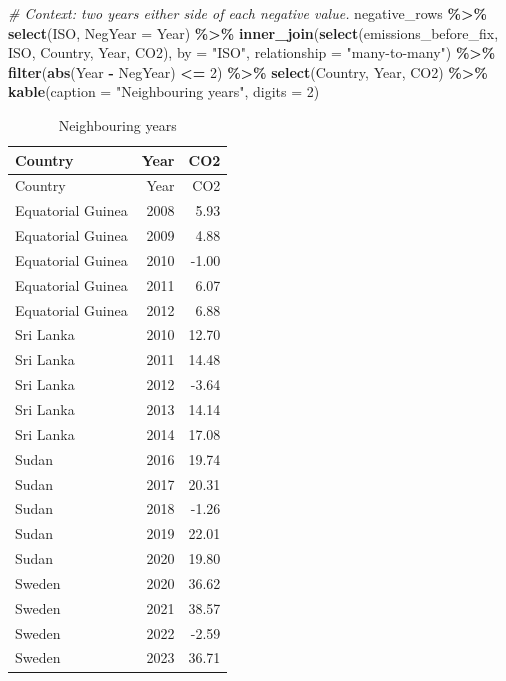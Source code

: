 \documentclass[
]{article}
\newenvironment{Shaded}{\begin{snugshade}}{\end{snugshade}}
\newcommand{\AttributeTok}[1]{\textcolor[rgb]{0.13,0.29,0.53}{#1}}
\newcommand{\CommentTok}[1]{\textcolor[rgb]{0.56,0.35,0.01}{\textit{#1}}}
\newcommand{\DecValTok}[1]{\textcolor[rgb]{0.00,0.00,0.81}{#1}}
\newcommand{\FunctionTok}[1]{\textcolor[rgb]{0.13,0.29,0.53}{\textbf{#1}}}
\newcommand{\NormalTok}[1]{#1}
\newcommand{\SpecialCharTok}[1]{\textcolor[rgb]{0.81,0.36,0.00}{\textbf{#1}}}
\newcommand{\StringTok}[1]{\textcolor[rgb]{0.31,0.60,0.02}{#1}}
\begin{document}
\begin{Shaded}
\begin{Highlighting}[]
\CommentTok{\# Context: two years either side of each negative value.}
\NormalTok{negative\_rows }\SpecialCharTok{\%\textgreater{}\%}
  \FunctionTok{select}\NormalTok{(ISO, }\AttributeTok{NegYear =}\NormalTok{ Year) }\SpecialCharTok{\%\textgreater{}\%}
  \FunctionTok{inner\_join}\NormalTok{(}\FunctionTok{select}\NormalTok{(emissions\_before\_fix, ISO, Country, Year, CO2),}
             \AttributeTok{by =} \StringTok{"ISO"}\NormalTok{, }\AttributeTok{relationship =} \StringTok{"many{-}to{-}many"}\NormalTok{) }\SpecialCharTok{\%\textgreater{}\%}
  \FunctionTok{filter}\NormalTok{(}\FunctionTok{abs}\NormalTok{(Year }\SpecialCharTok{{-}}\NormalTok{ NegYear) }\SpecialCharTok{\textless{}=} \DecValTok{2}\NormalTok{) }\SpecialCharTok{\%\textgreater{}\%}
  \FunctionTok{select}\NormalTok{(Country, Year, CO2) }\SpecialCharTok{\%\textgreater{}\%}
  \FunctionTok{kable}\NormalTok{(}\AttributeTok{caption =} \StringTok{"Neighbouring years"}\NormalTok{, }\AttributeTok{digits =} \DecValTok{2}\NormalTok{)}
\end{Highlighting}
\end{Shaded}

\begin{longtable}[]{@{}lrr@{}}
\caption{Neighbouring years}\tabularnewline
\toprule\noalign{}
Country & Year & CO2 \\
\midrule\noalign{}
\endfirsthead
\toprule\noalign{}
Country & Year & CO2 \\
\midrule\noalign{}
\endhead
\bottomrule\noalign{}
\endlastfoot
Equatorial Guinea & 2008 & 5.93 \\
Equatorial Guinea & 2009 & 4.88 \\
Equatorial Guinea & 2010 & -1.00 \\
Equatorial Guinea & 2011 & 6.07 \\
Equatorial Guinea & 2012 & 6.88 \\
Sri Lanka & 2010 & 12.70 \\
Sri Lanka & 2011 & 14.48 \\
Sri Lanka & 2012 & -3.64 \\
Sri Lanka & 2013 & 14.14 \\
Sri Lanka & 2014 & 17.08 \\
Sudan & 2016 & 19.74 \\
Sudan & 2017 & 20.31 \\
Sudan & 2018 & -1.26 \\
Sudan & 2019 & 22.01 \\
Sudan & 2020 & 19.80 \\
Sweden & 2020 & 36.62 \\
Sweden & 2021 & 38.57 \\
Sweden & 2022 & -2.59 \\
Sweden & 2023 & 36.71 \\
\end{longtable}
\end{document}
